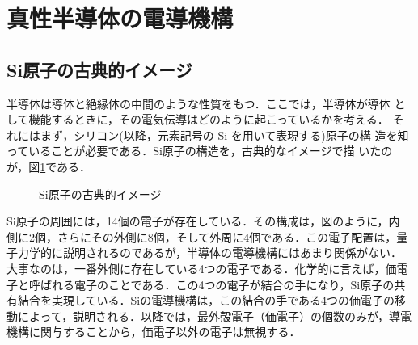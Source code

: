     \section{真性半導体の電導機構}
        \subsection{Si原子の古典的イメージ}
            半導体は導体と絶縁体の中間のような性質をもつ．ここでは，半導体が導体
            として機能するときに，その電気伝導はどのように起こっているかを考える．
            それにはまず，シリコン(以降，元素記号の Si を用いて表現する)原子の構
            造を知っていることが必要である．Si原子の構造を，古典的なイメージで描
            いたのが，図\ref{fig:SiGenshi}である．
                            \begin{figure}[htbp]
                                \begin{center}
                                    \caption{Si原子の古典的イメージ}
                                    \label{fig:SiGenshi}
                                \end{center}
                            \end{figure}
            Si原子の周囲には，14個の電子が存在している．その構成は，図のように，内
            側に2個，さらにその外側に8個，そして外周に4個である．この電子配置は，量
            子力学的に説明されるのであるが，半導体の電導機構にはあまり関係がない．
            大事なのは，一番外側に存在している4つの電子である．化学的に言えば，価電
            子と呼ばれる電子のことである．この4つの電子が結合の手になり，Si原子の共
            有結合を実現している．Siの電導機構は，この結合の手である4つの価電子の移
            動によって，説明される．以降では，最外殻電子（価電子）の個数のみが，導電
            機構に関与することから，価電子以外の電子は無視する．

